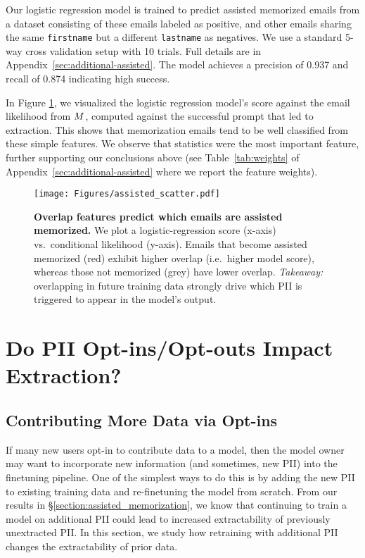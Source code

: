Our logistic regression model is trained to predict assisted memorized emails from a dataset consisting of these emails labeled as positive, and other emails sharing the same \texttt{firstname} but a different \texttt{lastname} as negatives. We use a standard 5-way cross validation setup with 10 trials. Full details are in Appendix~\ref{sec:additional-assisted}. The model achieves a precision of 0.937 and recall of 0.874 indicating high success. 

    





In Figure \ref{fig:assisted_scatter}, we visualized the logistic regression model's score against the email likelihood from $M$, computed against the successful prompt that led to extraction. This shows that \assisted memorization emails tend to be well classified from these simple features.
We observe that \ngram statistics were the most important feature, further supporting our conclusions above (see Table~\ref{tab:weights} of Appendix~\ref{sec:additional-assisted} where we report the feature weights).







\begin{figure}[t]
  \centering
  \texttt{[image: Figures/assisted\_scatter.pdf]}
  \caption{\textbf{Overlap features predict which emails are assisted memorized.} We plot a logistic-regression score (x-axis) vs.\ conditional likelihood (y-axis). Emails that become assisted memorized (red) exhibit higher \ngrams overlap (i.e.\ higher model score), whereas those not memorized (grey) have lower overlap. 
  \textit{Takeaway:} overlapping \ngrams in future training data strongly drive which PII is triggered to appear in the model’s output.}
  \vspace{-1em}
  \label{fig:assisted_scatter}
\end{figure}






\section{Do PII Opt-ins/Opt-outs Impact Extraction?}
\label{section:in_out}
\subsection{Contributing More Data via Opt-ins}
\label{section:opt-in}
If many new users opt-in to contribute data to a model, then the model owner may want to incorporate new information (and sometimes, new PII) into the finetuning pipeline. 
One of the simplest ways to do this is by adding the new PII to existing training data and re-finetuning the model from scratch. From our results in \S\ref{section:assisted_memorization}, we know that continuing to train a model on additional PII could lead to increased extractability of previously unextracted PII. 
In this section, we study how retraining with additional PII changes the extractability of prior data.

